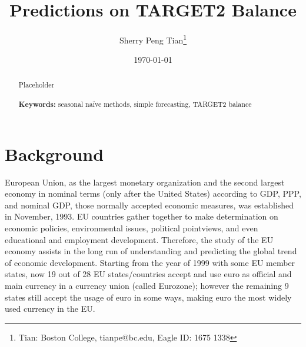 \documentclass[12pt]{article}
\begin{document}
\begin{titlepage}
\title{Predictions on TARGET2 Balance}
\author{Sherry Peng Tian\thanks{Tian: Boston College, tianpe@bc.edu, Eagle ID: 1675 1338}}
\date{\today}
\maketitle
\begin{abstract}
\noindent Placeholder\\
\vspace{0in}\\
\noindent\textbf{Keywords:} seasonal naïve methods, simple forecasting, TARGET2 balance\\
\bigskip
\end{abstract}
\setcounter{page}{0}
\thispagestyle{empty}
\end{titlepage}

\pagebreak \newpage
\doublespacing


\section{Background} \label{sec:background}

European Union, as the largest monetary organization and the second largest economy in nominal terms (only after the United States) according to GDP, PPP, and nominal GDP, those normally accepted economic measures, was established in November, 1993. EU countries gather together to make determination on economic policies, environmental issues, political pointviews, and even educational and employment development. Therefore, the study of the EU economy assists in the long run of understanding and predicting the global trend of economic development. Starting from the year of 1999 with some EU member states, now 19 out of 28 EU states/countries accept and use euro as official and main currency in a currency union (called Eurozone); however the remaining 9 states still accept the usage of euro in some ways, making euro the most widely used currency in the EU. 
\end{document}
